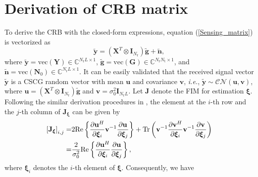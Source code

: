 \documentclass[10pt,journal,twocolumn]{IEEEtran}
\begin{document}
\appendices
\section{Derivation of CRB matrix}
To derive the CRB with the closed-form expressions, equation (\ref{Sensing_matrix}) is vectorized as 
\begin{equation}
\tilde{\mathbf{y}}=\left(\mathbf{X}^T\otimes\mathbf{I}_{N_{\text{r}}}\right)\tilde{\mathbf{g}}+\tilde{\mathbf{n}},
\label{Vectorized_Sensing}
\end{equation}
where $\tilde{\mathbf{y}}=\text{vec}\left(\mathbf{Y}\right)\in\mathbb{C}^{N_{\text{r}}L\times 1}$, $\tilde{\mathbf{g}}=\text{vec}\left(\mathbf{G}\right)\in\mathbb{C}^{N_{\text{r}}N_{\text{t}}\times 1}$, and $\tilde{\mathbf{n}}=\text{vec}\left(\mathbf{N}_0\right)\in\mathbb{C}^{N_{\text{r}}L\times 1}$.
It can be easily validated that the received signal vector $\tilde{\mathbf{y}}$ is a CSCG random vector with mean $\mathbf{u}$ and covariance $\mathbf{v}$, \emph{i.e.}, $\tilde{\mathbf{y}}\sim \mathcal{CN}\left(\mathbf{u},\mathbf{v}\right)$, where $\mathbf{u}=\left(\mathbf{X}^T\otimes\mathbf{I}_{N_{\text{r}}}\right)\tilde{\mathbf{g}}$ and $\mathbf{v}=\sigma^2_0\mathbf{I}_{N_{\text{r}}L}$. Let $\mathbf{J}$ denote the FIM for estimation $\boldsymbol{\xi}$. Following the similar derivation procedures in \cite{4359542}, the element at the $i$-th row and the $j$-th column of $\mathbf{J}_{\bm{\xi}}$ can be given by 
\begin{align}
\left[\mathbf{J}_{\bm{\xi}}\right]_{i,j}=& 2\text{Re}\left\{\frac{\partial \mathbf{u}^H}{\partial \bm{\xi}_i}\mathbf{v}^{-1}\frac{\partial \mathbf{u}}{\partial \bm{\xi}_j}\right\} + \text{Tr}\left(\mathbf{v}^{-1}\frac{\partial \mathbf{v}^H}{\partial \bm{\xi}_i}\mathbf{v}^{-1}\frac{\partial \mathbf{v}}{\partial \bm{\xi}_j}\right) \notag\\=& \frac{2}{\sigma^2_0}\text{Re}\left\{\frac{\partial \mathbf{u}^H}{\partial \bm{\xi}_i}\frac{\partial \mathbf{u}}{\partial \bm{\xi}_j}\right\},
\end{align}
where $\bm{\xi}_i$ denotes the $i$-th element of $\bm{\xi}$. Consequently, we have
\end{document}
